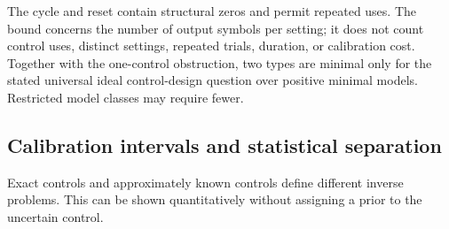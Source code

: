 The cycle and reset contain structural zeros and permit repeated uses.
The bound concerns the number of output symbols per setting; it does
not count control uses, distinct settings, repeated trials, duration,
or calibration cost.  Together with the one-control obstruction, two
types are minimal only for the stated universal ideal control-design
question over positive minimal models.  Restricted model classes may
require fewer.

\subsection{Calibration intervals and statistical separation}
\label{op:calibration}

Exact controls and approximately known controls define different
inverse problems.  This can be shown quantitatively without assigning
a prior to the uncertain control.

